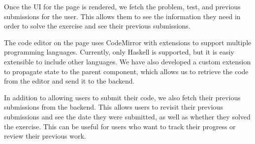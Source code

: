 Once the UI for the page is rendered, we fetch the problem, test, and previous submissions for the user.
This allows them to see the information they need in order to solve the exercise and see their previous submissions.

The code editor on the page uses CodeMirror with extensions to support multiple programming languages.
Currently, only Haskell is supported, but it is easiy extensible to include other languages.
We have also developed a custom extension to propagate state to the parent component, which allows us to retrieve the code from the editor and send it to the backend.

In addition to allowing users to submit their code, we also fetch their previous submissions from the backend.
This allows users to revisit their previous submissions and see the date they were submitted, as well as whether they solved the exercise.
This can be useful for users who want to track their progress or review their previous work.


